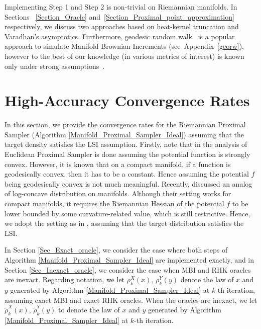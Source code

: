 Implementing Step 1 and Step 2 is non-trivial on Riemannian manifolds. In Sections ~\ref{Section_Oracle} and~\ref{Section_Proximal_point_approximation} respectively, we discuss two approaches based on heat-kernel truncation and Varadhan's asymptotics. Furthermore, geodesic random walk~\citep{mangoubi2018rapid,schwarz2023efficient} is a popular approach to simulate Manifold Brownian Increments (see~Appendix~\ref{georw}), however to the best of our knowledge (in various metrics of interest) is known only under strong assumptions~\citep{cheng2022efficient,mangoubi2018rapid}.

\section{High-Accuracy Convergence Rates}

In this section, we provide the convergence rates for the Riemannian Proximal Sampler (Algorithm \ref{Manifold_Proximal_Sampler_Ideal}) assuming that the target density satisfies the LSI assumption. Firstly, note that in \citep{lee2021structured} the analysis of Euclidean Proximal Sampler is done assuming the potential function is strongly convex. However, it is known that on a compact manifold, if a function is geodesically convex, then it has to be a constant. Hence assuming the potential $f$ being geodesically convex is not much meaningful. Recently, \cite{cheng2022efficient} discussed an analog of log-concave distribution on manifolds.
Although their setting works for compact manifolds, it requires the Riemannian Hessian of the potential $f$ to be lower 
bounded by some curvature-related value, which is still restrictive. Hence, we adopt the setting as in \cite{chen2022improved}, assuming that the target distribution satisfies the LSI.


In Section \ref{Sec_Exact_oracle}, we consider the case where both steps of Algorithm \ref{Manifold_Proximal_Sampler_Ideal} are implemented exactly, and in Section \ref{Sec_Inexact_oracle}, we consider the case when MBI and RHK oracles are inexact. Regarding notation, we let $\rho_{k}^{X}(x)$, $\rho_{k}^{Y}(y)$ denote the law of $x$ and $y$ generated by Algorithm \ref{Manifold_Proximal_Sampler_Ideal} at $k$-th iteration, 
assuming exact MBI and exact RHK oracles. When the oracles are inexact, we let $\tilde{\rho}_{k}^{X}(x)$, $\tilde{\rho}_{k}^{Y}(y)$ to denote the law of $x$ and $y$ generated by Algorithm \ref{Manifold_Proximal_Sampler_Ideal} at $k$-th iteration.


